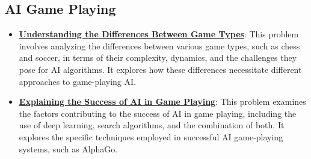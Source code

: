 \documentclass{article}%
\begin{document}
%
\subsection{AI Game Playing}%
\label{subsec:AIGamePlaying}%
\begin{itemize}[leftmargin=*]%
\item \href{https://purdue.brightspace.com/d2l/common/assets/pdfjs-d2l-dist/1.0.14-legacy/web/viewer.html?file=\%2Fcontent\%2Fenforced\%2F1095467-wl.202510.CS.24300.001\%2F02L2-Intro.pdf\%3Fou\%3D1095467\&lang=en-us\&container=d2l-fileviewer-rendered-pdf\&fullscreen=d2l-fileviewer-rendered-pdf-dialog\&height=667#page=27}{\textbf{Understanding the Differences Between Game Types}}: This problem involves analyzing the differences between various game types, such as chess and soccer, in terms of their complexity, dynamics, and the challenges they pose for AI algorithms. It explores how these differences necessitate different approaches to game{-}playing AI.%
\item \href{https://purdue.brightspace.com/d2l/common/assets/pdfjs-d2l-dist/1.0.14-legacy/web/viewer.html?file=\%2Fcontent\%2Fenforced\%2F1095467-wl.202510.CS.24300.001\%2F02L2-Intro.pdf\%3Fou\%3D1095467\&lang=en-us\&container=d2l-fileviewer-rendered-pdf\&fullscreen=d2l-fileviewer-rendered-pdf-dialog\&height=667#page=49}{\textbf{Explaining the Success of AI in Game Playing}}: This problem examines the factors contributing to the success of AI in game playing, including the use of deep learning, search algorithms, and the combination of both. It explores the specific techniques employed in successful AI game{-}playing systems, such as AlphaGo.%
\end{itemize}

%
\end{document}

